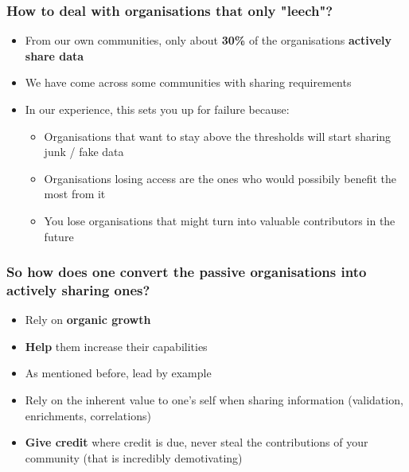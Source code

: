 \begin{frame}
\frametitle{How to deal with organisations that only "leech"?}
\begin{itemize}
    \item From our own communities, only about \textbf{30\%} of the organisations \textbf{actively share data}
	\item We have come across some communities with sharing requirements
	\item In our experience, this sets you up for failure because:
	\begin{itemize}
		\item Organisations that want to stay above the thresholds will start sharing junk / fake data
		\item Organisations losing access are the ones who would possibily benefit the most from it
		\item You lose organisations that might turn into valuable contributors in the future
	\end{itemize}
\end{itemize}
\end{frame}

\begin{frame}
	\frametitle{So how does one convert the passive organisations into actively sharing ones?}
	\begin{itemize}
		\item Rely on \textbf{organic growth}
		\item \textbf{Help} them increase their capabilities
		\item As mentioned before, lead by example
		\item Rely on the inherent value to one's self when sharing information (validation, enrichments, correlations)
		\item \textbf{Give credit} where credit is due, never steal the contributions of your community (that is incredibly demotivating)
	\end{itemize}
\end{frame}

